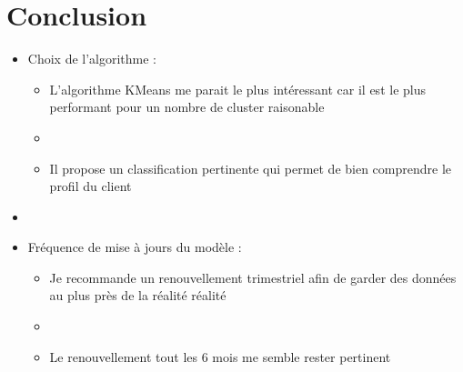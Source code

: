 \documentclass[8pt,aspectratio=169,hyperref={unicode=true}]{beamer}
\begin{document}
\section{Conclusion}
\begin{frame}
    \begin{itemize}
        \item Choix de l'algorithme :
              \begin{itemize}
                  \item L'algorithme KMeans me parait le plus intéressant car il est le plus performant pour un  nombre de cluster raisonable
                  \item[]
                  \item Il propose un classification pertinente qui permet de bien comprendre le profil du client
              \end{itemize}
        \item[]
        \item Fréquence de mise à jours du modèle :
              \begin{itemize}
                  \item Je recommande un renouvellement trimestriel afin de garder des données au plus près de la réalité réalité
                  \item[]
                  \item Le renouvellement tout les 6 mois me semble rester pertinent
              \end{itemize}
    \end{itemize}
\end{frame}
\end{document}
